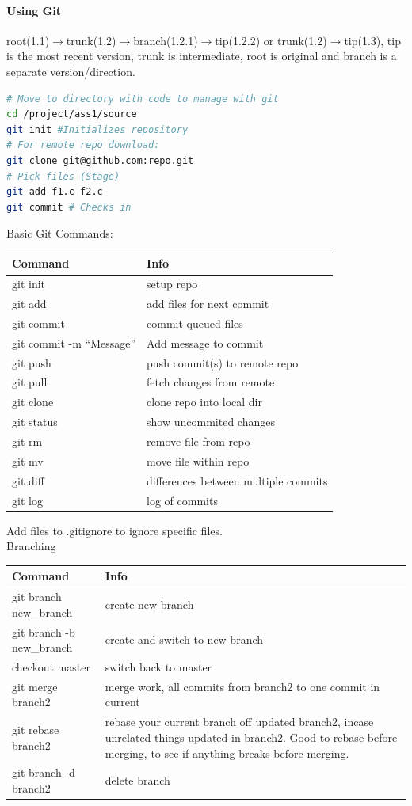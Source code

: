 \documentclass[12 pt]{article}
\begin{document}
\paragraph{Using Git}
root(1.1)$\to$trunk(1.2)$\to$branch(1.2.1)$\to$tip(1.2.2) or trunk(1.2)$\to$tip(1.3), tip is the most recent version, trunk is intermediate, root is original and branch is a separate version/direction.
\begin{lstlisting}[language=bash]
# Move to directory with code to manage with git
cd /project/ass1/source
git init #Initializes repository
# For remote repo download:
git clone git@github.com:repo.git
# Pick files (Stage)
git add f1.c f2.c
git commit # Checks in
\end{lstlisting}
Basic Git Commands:
\begin{tabularx}{1.0\linewidth}{|X|X|}
  \hline
  \textbf{Command} & \textbf{Info}
  \\\hline git init  & setup repo
  \\ \hline git add & add files for next commit
  \\ \hline git commit & commit queued files
  \\ \hline git commit -m ``Message'' & Add message to commit
  \\ \hline git push & push commit(s) to remote repo
  \\ \hline git pull & fetch changes from remote
  \\ \hline git clone & clone repo into local dir
  \\ \hline git status & show uncommited changes
  \\ \hline git rm & remove file from repo
  \\ \hline git mv & move file within repo
  \\ \hline git diff & differences between multiple commits
  \\ \hline git log & log of commits
  \\ \hline
\end{tabularx}
Add files to .gitignore to ignore specific files.
\\ Branching
\begin{tabularx}{1.0\linewidth}{|X|X|}
  \hline \textbf{Command} & \textbf{Info}
  \\ \hline git branch new\_branch & create new branch
  \\ \hline git branch -b new\_branch & create and switch to new branch
  \\ \hline checkout master & switch back to master
  \\ \hline git merge branch2 & merge work, all commits from branch2 to one commit in current
  \\ \hline git rebase branch2 & rebase your current branch off updated branch2, incase unrelated things updated in branch2. Good to rebase before merging, to see if anything breaks before merging.
  \\ \hline git branch -d branch2 & delete branch
  \\ \hline
\end{tabularx}
\end{document}
